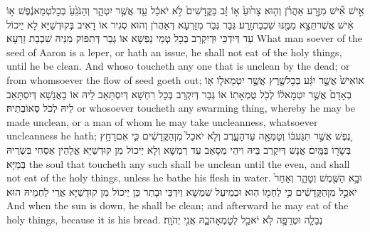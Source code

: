 {אִ֣ישׁ אִ֞ישׁ מִזֶּ֣רַע אַהֲרֹ֗ן וְה֤וּא צָר֙וּעַ֙ א֣וֹ זָ֔ב בַּקֳּדָשִׁים֙ לֹ֣א יֹאכַ֔ל עַ֖ד אֲשֶׁ֣ר יִטְהָ֑ר וְהַנֹּגֵ֙עַ֙ בְּכׇל\maqqaf טְמֵא\maqqaf נֶ֔פֶשׁ א֣וֹ אִ֔ישׁ אֲשֶׁר\maqqaf תֵּצֵ֥א מִמֶּ֖נּוּ שִׁכְבַת\maqqaf זָֽרַע׃}
{גְּבַר גְּבַר מִזַּרְעָא דְּאַהֲרֹן וְהוּא סְגִיר אוֹ דָאִיב בְּקוּדְשַׁיָּא לָא יֵיכוֹל עַד דְּיִדְכֵּי וּדְיִקְרַב בְּכָל טְמֵי נַפְשָׁא אוֹ גְּבַר דְּתִפּוֹק מִנֵּיהּ שִׁכְבַת זַרְעָא׃}
{What man soever of the seed of Aaron is a leper, or hath an issue, he shall not eat of the holy things, until he be clean. And whoso toucheth any one that is unclean by the dead; or from whomsoever the flow of seed goeth out;}{}
{אוֹ\maqqaf אִישׁ֙ אֲשֶׁ֣ר יִגַּ֔ע בְּכׇל\maqqaf שֶׁ֖רֶץ אֲשֶׁ֣ר יִטְמָא\maqqaf ל֑וֹ א֤וֹ בְאָדָם֙ אֲשֶׁ֣ר יִטְמָא\maqqaf ל֔וֹ לְכֹ֖ל טֻמְאָתֽוֹ׃}
{אוֹ גְּבַר דְּיִקְרַב בְּכָל רִחְשָׁא דְּיִסְתָּאַב לֵיהּ אוֹ בַאֲנָשָׁא דְּיִסְתָּאַב לֵיהּ לְכֹל סְאוֹבְתֵיהּ׃}
{or whosoever toucheth any swarming thing, whereby he may be made unclean, or a man of whom he may take uncleanness, whatsoever uncleanness he hath;}{}
{נֶ֚פֶשׁ אֲשֶׁ֣ר תִּגַּע\maqqaf בּ֔וֹ וְטָמְאָ֖ה עַד\maqqaf הָעָ֑רֶב וְלֹ֤א יֹאכַל֙ מִן\maqqaf הַקֳּדָשִׁ֔ים כִּ֛י אִם\maqqaf רָחַ֥ץ בְּשָׂר֖וֹ בַּמָּֽיִם׃}
{אֱנָשׁ דְּיִקְרַב בֵּיהּ וִיהֵי מְסָאַב עַד רַמְשָׁא וְלָא יֵיכוֹל מִן קוּדְשַׁיָּא אֱלָהֵין אַסְחִי בִּשְׂרֵיהּ בְּמַיָּא׃}
{the soul that toucheth any such shall be unclean until the even, and shall not eat of the holy things, unless he bathe his flesh in water.}{}
{וּבָ֥א הַשֶּׁ֖מֶשׁ וְטָהֵ֑ר וְאַחַר֙ יֹאכַ֣ל מִן\maqqaf הַקֳּדָשִׁ֔ים כִּ֥י לַחְמ֖וֹ הֽוּא׃}
{וּכְמֵיעַל שִׁמְשָׁא וְיִדְכֵּי וּבָתַר כֵּן יֵיכוֹל מִן קוּדְשַׁיָּא אֲרֵי לַחְמֵיהּ הוּא׃}
{And when the sun is down, he shall be clean; and afterward he may eat of the holy things, because it is his bread.}{}
{נְבֵלָ֧ה וּטְרֵפָ֛ה לֹ֥א יֹאכַ֖ל לְטׇמְאָה\maqqaf בָ֑הּ אֲנִ֖י יְהֹוָֽה׃}
